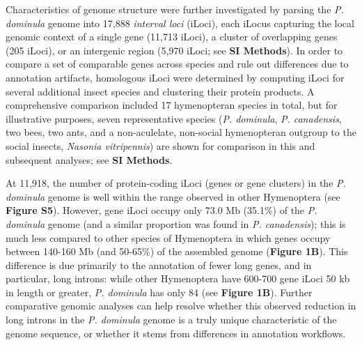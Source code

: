 Characteristics of genome structure were further investigated by parsing
the \textit{P. dominula} genome into 17,888 \textit{interval loci} (iLoci),
each iLocus capturing the local genomic context of a single gene (11,713
iLoci), a cluster of overlapping genes (205 iLoci), or an intergenic
region (5,970 iLoci; see \textbf{SI Methods}). In order to compare a set
of comparable genes across species and rule out differences due to
annotation artifacts, homologous iLoci were determined by computing
iLoci for several additional insect species and clustering their protein
products. A comprehensive comparison included 17 hymenopteran species in
total, but for illustrative purposes, seven representative species
(\textit{P. dominula}, \textit{P. canadensis}, two bees, two ants, and a
non-aculelate, non-social hymenopteran outgroup to the social insects,
\textit{Nasonia vitripennis}) are shown for comparison in this and
subsequent analyses; see \textbf{SI Methods}.

At 11,918, the number of protein-coding iLoci (genes or gene clusters)
in the \textit{P. dominula} genome is well within the range observed in
other Hymenoptera (see \textbf{Figure S5}). However, gene iLoci occupy
only 73.0 Mb (35.1\%) of the \textit{P. dominula} genome (and a similar
proportion was found in \textit{P. canadensis}); this is much less
compared to other species of Hymenoptera in which genes occupy between
140-160 Mb (and 50-65\%) of the assembled genome (\textbf{Figure 1B}).
This difference is due primarily to the annotation of fewer long genes,
and in particular, long introns: while other Hymenoptera have 600-700
gene iLoci 50 kb in length or greater, \textit{P. dominula} has only 84
(see \textbf{Figure 1B}). Further comparative genomic analyses can help
resolve whether this observed reduction in long introns in the \textit{P.
dominula} genome is a truly unique characteristic of the genome
sequence, or whether it stems from differences in annotation workflows.

